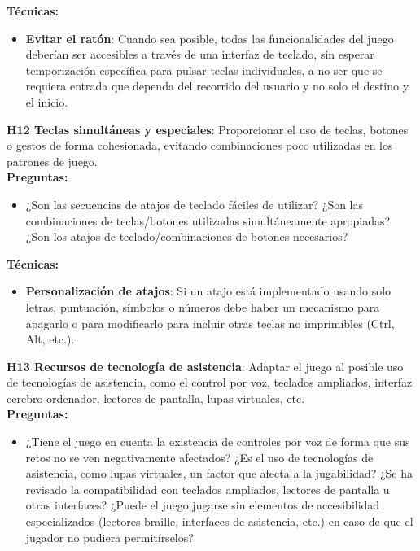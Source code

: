 \textbf{Técnicas:}
\begin{itemize}
	\item \textbf{Evitar el ratón}: Cuando sea posible, todas las funcionalidades del juego deberían ser accesibles a través de una interfaz de teclado, sin esperar temporización específica para pulsar teclas individuales, a no ser que se requiera entrada que dependa del recorrido del usuario y no solo el destino y el inicio. \cite{WebContentAccessibility}
\end{itemize}
  \textbf{H12 Teclas simultáneas y especiales}: Proporcionar el uso de teclas, botones o gestos de forma cohesionada, evitando combinaciones poco utilizadas en los patrones de juego. \cite{teixeiraborgesFairPlayGuidelines2018a}\\
\textbf{Preguntas:}
\begin{itemize}
	\item ¿Son las secuencias de atajos de teclado fáciles de utilizar? ¿Son las combinaciones de teclas/botones utilizadas simultáneamente apropiadas? ¿Son los atajos de teclado/combinaciones de botones necesarios?
\end{itemize}
\textbf{Técnicas:}
\begin{itemize}
	\item \textbf{Personalización de atajos}: Si un atajo está implementado usando solo letras, puntuación, símbolos o números debe haber un mecanismo para apagarlo o para modificarlo para incluir otras teclas no imprimibles (Ctrl, Alt, etc.). \cite{WebContentAccessibility}
\end{itemize}
  \textbf{H13 Recursos de tecnología de asistencia}: Adaptar el juego al posible uso de tecnologías de asistencia, como el control por voz, teclados ampliados, interfaz cerebro-ordenador, lectores de pantalla, lupas virtuales, etc. \cite{nesteriukAudiogamesAccessibilityInclusion2018a} \cite{teixeiraborgesFairPlayGuidelines2018a}\\
\textbf{Preguntas:}
\begin{itemize}
	\item ¿Tiene el juego en cuenta la existencia de controles por voz de forma que sus retos no se ven negativamente afectados? ¿Es el uso de tecnologías de asistencia, como lupas virtuales, un factor que afecta a la jugabilidad? ¿Se ha revisado la compatibilidad con teclados ampliados, lectores de pantalla u otras interfaces? ¿Puede el juego jugarse sin elementos de accesibilidad especializados (lectores braille, interfaces de asistencia, etc.) en caso de que el jugador no pudiera permitírselos?
\end{itemize}
